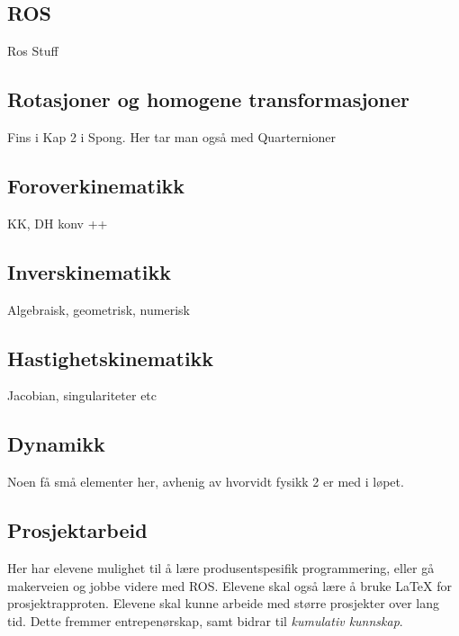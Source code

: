 \subsection*{ROS}
    Ros Stuff


\subsection*{Rotasjoner og homogene transformasjoner}
    Fins i Kap 2 i Spong. Her tar man også med Quarternioner


\subsection*{Foroverkinematikk}
    KK, DH konv ++


\subsection*{Inverskinematikk}
    Algebraisk, geometrisk, numerisk


\subsection*{Hastighetskinematikk}
    Jacobian, singulariteter etc


\subsection*{Dynamikk}
    Noen få små elementer her, avhenig av hvorvidt fysikk 2 er med i løpet.


\subsection*{Prosjektarbeid}
    Her har elevene mulighet til å lære produsentspesifik programmering, eller gå makerveien og jobbe videre med ROS. Elevene skal også lære å bruke LaTeX for prosjektrapproten. Elevene skal kunne arbeide med større prosjekter over lang tid. Dette fremmer entrepenørskap, samt bidrar til \emph{kumulativ kunnskap}.
